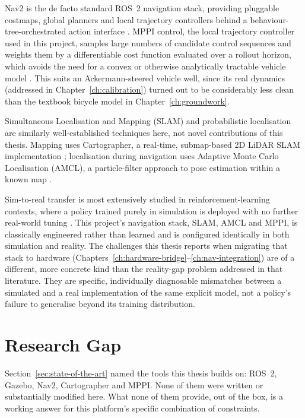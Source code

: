 Nav2 is the de facto standard ROS~2 navigation stack, providing
pluggable costmaps, global planners and local trajectory
controllers behind a behaviour-tree-orchestrated action interface
\cite{macenski2020nav2}. MPPI control, the local trajectory
controller used in this project, samples large numbers of candidate
control sequences and weights them by a differentiable cost function
evaluated over a rollout horizon, which avoids the need for a convex
or otherwise analytically tractable vehicle model
\cite{williams2015mppi}. This suits an Ackermann-steered vehicle
well, since its real dynamics (addressed in
Chapter~\ref{ch:calibration}) turned out to be considerably less
clean than the textbook bicycle model in Chapter~\ref{ch:groundwork}.

Simultaneous Localisation and Mapping (SLAM) and probabilistic
localisation are similarly well-established techniques here, not
novel contributions of this thesis. Mapping uses Cartographer, a
real-time, submap-based 2D LiDAR SLAM implementation
\cite{hess2016cartographer}; localisation during navigation uses
Adaptive Monte Carlo Localisation (AMCL), a particle-filter approach
to pose estimation within a known map
\cite{thrun2000probrob,thrun2001robustmcl}.

Sim-to-real transfer is most extensively studied in
reinforcement-learning contexts, where a policy trained purely in
simulation is deployed with no further real-world tuning
\cite{zhao2020sim2real}. This project's navigation stack, SLAM,
AMCL and MPPI, is classically engineered rather than learned and
is configured identically in both simulation and reality. The
challenges this thesis reports when migrating that stack to hardware
(Chapters~\ref{ch:hardware-bridge}--\ref{ch:nav-integration}) are of
a different, more concrete kind than the reality-gap problem
addressed in that literature. They are specific, individually
diagnosable mismatches between a simulated and a real implementation
of the same explicit model, not a policy's failure to generalise
beyond its training distribution.

\section{Research Gap}
\label{sec:research-gap}

Section~\ref{sec:state-of-the-art} named the tools this thesis builds
on: ROS~2, Gazebo, Nav2, Cartographer and MPPI. None of them were
written or substantially modified here. What none of them provide,
out of the box, is a working answer for this platform's specific
combination of constraints.


